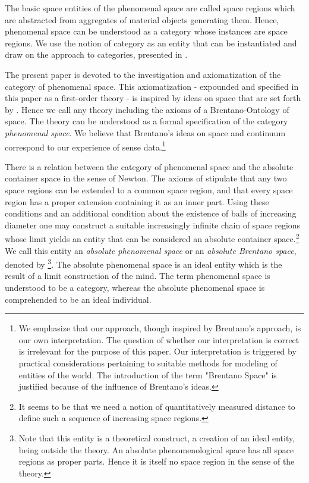 \documentclass{ao2e}
\begin{document}
The basic space entities of the phenomenal space are called space regions which are abstracted from aggregates of material objects generating them. Hence, phenomenal space can be understood as a category whose instances are space regions. We use the notion of category as an entity that can be instantiated and draw on
the approach to categories, presented in \cite{gracia-j-1999-a}.

The present paper is devoted to the investigation and axiomatization of the category of phenomenal space. This axiomatization - expounded and specified in this paper as a first-order theory  - is inspired by ideas on space that are set forth by \cite{brentano-f-1976-a}. Hence we call any theory including the axioms of  a Brentano-Ontology of space. The theory  can be understood as a formal specification of the category {\it phenomenal space}. We believe that Brentano's ideas on space and continuum correspond to our experience of sense data.\footnote{We emphasize that our approach, though inspired by Brentano's approach, is our own interpretation.  The question of whether our interpretation is correct is irrelevant for the purpose of this paper. Our interpretation is triggered by practical considerations pertaining to suitable methods for modeling of entities of the world. The introduction of the term "Brentano Space" is justified because of the influence of Brentano's ideas.}

There is a relation between the category of phenomenal space and the absolute container space in the sense of Newton. The axioms of  stipulate that any two space regions can be extended to a common 
space region, and that every space region has a proper extension containing it as an inner part. Using these conditions and an additional condition about the existence of balls of increasing diameter one may construct a suitable increasingly infinite chain of space regions whose limit yields an entity that can be considered an absolute container space.\footnote{It seems to be that we need a notion of quantitatively measured distance to define such a sequence of increasing space regions.}
We call this entity an \textit{absolute phenomenal space} or an \textit{absolute Brentano space}, denoted by  \footnote{Note that this entity is a theoretical construct, a creation of an ideal entity, being outside the theory. An absolute phenomenological space has all space regions as proper parts. Hence it is itself no space region in the sense of the theory.}. The absolute phenomenal space is an ideal entity which is the result of a limit construction of the mind. The term phenomenal space is understood to be a category, whereas the absolute phenomenal space is comprehended to be an ideal individual.
\end{document}
